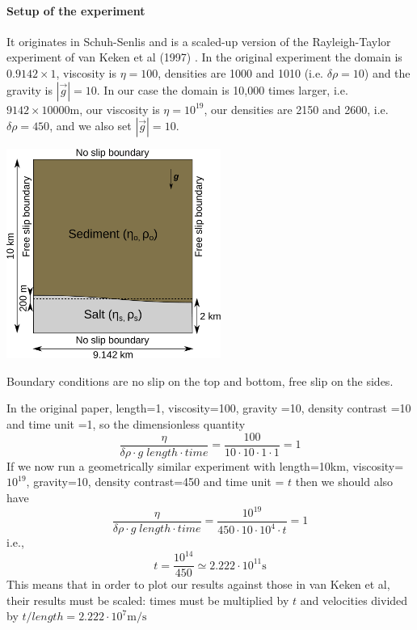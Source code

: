 
\paragraph{Setup of the experiment} It originates in Schuh-Senlis \etal \cite{sctc20} 
and is a scaled-up version of the Rayleigh-Taylor experiment of van Keken et al (1997) \cite{vaks97}.
In the original experiment the domain is $0.9142\times1$, viscosity is $\eta=100$, 
densities are 1000 and 1010 (i.e. $\delta \rho=10$) and the gravity is $|\vec{g}|=10$.
In our case the domain is 10,000 times larger, i.e. $9142\times10000$m, 
our viscosity is $\eta=10^{19}$, our densities are 2150 and 2600, i.e. $\delta\rho = 450$, 
and we also set $|\vec{g}|=10$.

\begin{center}
\includegraphics[width=7cm]{python_codes/fieldstone_41/images/setup}
\end{center}

Boundary conditions are no slip on the top and bottom, free slip on the sides.

In the original paper, 
length=1, viscosity=100, gravity =10, density contrast =10 and time unit =1,
so the dimensionless quantity
\[
\frac{\eta}{\delta\rho \cdot g \; length \cdot time} = \frac{100}{10 \cdot 10 \cdot 1 \cdot 1} =1
\]
If we now run a geometrically similar experiment with 
length=10km, viscosity=$10^{19}$, gravity=10, density contrast=450 and time unit = $t$
then we should also have 
\[
\frac{\eta}{\delta\rho \cdot g \; length \cdot time} = \frac{10^{19}}{450 \cdot 10 \cdot 10^4 \cdot t} =1
\]
i.e.,
\[
t = \frac{10^{14}}{450} \simeq 2.222 \cdot 10^{11}\text{s}
\]
This means that in order to plot our results against those in van Keken et al, their results
must be scaled: times must be multiplied by $t$ and velocities divided by 
$t/length = 2.222 \cdot 10^{7}\text{m/s}$  


